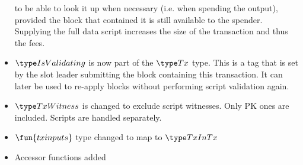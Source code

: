 \begin{itemize}
  to be able to look it up when necessary (i.e. when spending the output),
  provided the block that contained it is still available to the spender.
  Supplying the full data script increases the size of the transaction and
  thus the fees.
  \item $\IsValidating$ is now part of the $\Tx$ type. This is a tag that is
  set by the slot leader submitting the block containing this transaction.
  It can later be used to re-apply blocks without performing script validation
  again.
  \item $\TxWitness$ is changed to exclude script witnesses. Only PK ones
  are included. Scripts are handled separately.
  \item $\fun{txinputs}$ type changed to map to $\TxInTx$
  \item Accessor functions added
\end{itemize}



